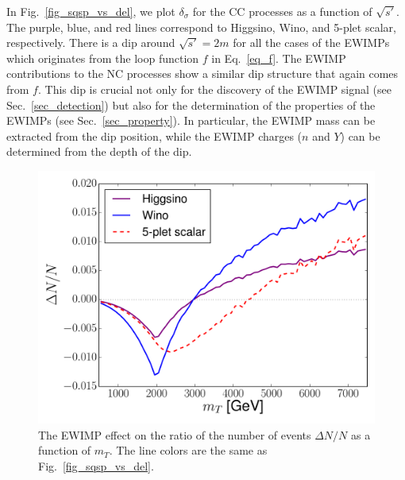 \documentclass[12pt,twoside,book]{article}
\begin{document}
In Fig.~\ref{fig_sqsp_vs_del}, we plot $\delta_\sigma$ for the CC
processes as a function of $\sqrt{s'}$.  The purple, blue, and red
lines correspond to Higgsino, Wino, and 5-plet scalar, respectively.
There is a dip around $\sqrt{s'} = 2m$ for all the cases of the EWIMPs
which originates from the loop function $f$ in Eq.~\eqref{eq_f}.  The
EWIMP contributions to the NC processes show a similar dip structure
that again comes from $f$.  This dip is crucial not only for the
discovery of the EWIMP signal (see Sec.~\ref{sec_detection}) but also
for the determination of the properties of the EWIMPs (see
Sec.~\ref{sec_property}).  In particular, the EWIMP mass can be
extracted from the dip position, while the EWIMP charges ($n$ and $Y$)
can be determined from the depth of the dip.

\begin{figure}[t]
 \centering
 \includegraphics[width=0.5\hsize]{mT_vs_del.pdf}
 \caption{The EWIMP effect on the ratio of the number of events $\Delta
   N / N$ as a function of $m_T$.  The line colors are the same as
   Fig.~\ref{fig_sqsp_vs_del}.}  \label{fig_mT_vs_dN}
\end{figure}
\end{document}
